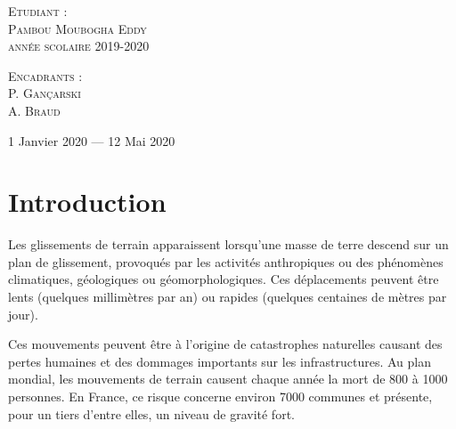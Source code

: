 \documentclass[11pt, openany]{report}
\begin{document}
\begin{titlepage}
\begin{sffamily}
\begin{center}
    \begin{minipage}{0.4\textwidth}
      \begin{flushleft} \large
      	\textsc{Etudiant :}\\ 
        \textsc{Pambou Moubogha Eddy}\\
         \textsc{année scolaire 2019-2020}\\
      \end{flushleft}
    \end{minipage}
    \begin{minipage}{0.4\textwidth}
      \begin{flushright} \large
        \textsc{Encadrants :}\\ 
        \textsc{P. Gançarski}\\
        \textsc{A. Braud}\\
      \end{flushright}
    \end{minipage}

    \vfill

    {\large 1\ier{} Janvier 2020 — 12 Mai 2020}

  \end{center}
  \end{sffamily}
\end{titlepage}
\newpage
\tableofcontents

\chapter{Introduction}
Les glissements de terrain apparaissent lorsqu'une masse de terre descend sur un plan de glissement, provoqués par les activités anthropiques ou des phénomènes climatiques, géologiques ou géomorphologiques.
Ces déplacements peuvent être lents (quelques millimètres par an) ou rapides (quelques centaines de mètres par jour). \par

Ces mouvements peuvent être à l'origine de catastrophes naturelles causant des pertes humaines et des dommages importants sur les infrastructures. Au plan mondial, les mouvements de terrain causent chaque année la mort de 800 à 1000 personnes. En France, ce risque concerne environ 7000 communes et présente, pour un tiers d’entre elles, un niveau de gravité fort.\par
\end{document}

